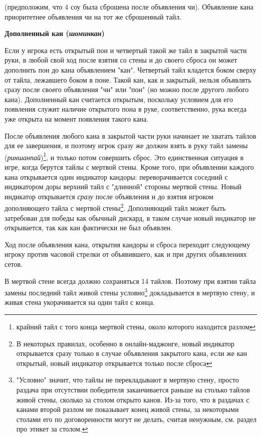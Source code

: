  \hfill {}

(предположим, что 4 соу была сброшена после объявления чи). Объявление кана приоритетнее объявления чи на тот же сброшенный тайл.

\textbf{Дополненный кан (\textit{шоминкан})}

Если у игрока есть открытый пон и четвертый такой же тайл в закрытой части руки, в любой свой ход после взятия со стены и до своего сброса он может дополнить пон до кана объявлением "кан". Четвертый тайл кладется боком сверху от тайла, лежавшего боком в поне. Такой кан, как и закрытый, нельзя объявлять сразу после своего объявления "чи" или "пон" (но можно после другого любого кана). Дополненный кан считается открытым, поскольку условием для его появления служит наличие открытого пона в руке, соответственно, рука всегда уже открыта на момент появления такого кана.


После объявления любого кана в закрытой части руки начинает не хватать тайлов для ее завершения, и поэтому игрок сразу же должен взять в руку тайл замены (\textit{риншанпай})\footnote{крайний тайл с того конца мертвой стены, около которого находится разлом}, и только потом совершить сброс. Это единственная ситуация в игре, когда берутся тайлы с мертвой стены. Кроме того, при объявлении каждого кана открывается один индикатор кандоры: переворачивается соседний с индикатором доры верхний тайл с "длинной" стороны мертвой стены. Новый индикатор открывается \textit{сразу} после объявления и до взятия игроком дополняющего тайла с мертвой стены\footnote{В некоторых правилах, особенно в онлайн-маджонге, новый индикатор открывается сразу только в случае объявления закрытого кана, если же кан открытый, новый индикатор открывается только после сброса}. Дополняющий тайл может быть затребован для победы как обычный дискард, в таком случае новый индикатор не открывается, так как кан фактически не был объявлен.

Ход после объявления кана, открытия кандоры и сброса переходит следующему игроку против часовой стрелки от объявившего, как и при других объявлениях сетов. 

В мертвой стене всегда должно сохраняться 14 тайлов. Поэтому при взятии тайла замены последний тайл живой стены условно\footnote{"Условно" значит, что тайлы не перекладывают в мертвую стену, просто раздача при отсутствии победителя заканчивается раньше на столько тайлов живой стены, сколько за столом открыто канов. Из-за того, что в раздачах с канами второй разлом не показывает конец живой стены, за некоторыми столами его по договоренности могут не делать, считая ненужным, см. раздел про этикет за столом.} докладывается в мертвую стену, и живая стена укорачивается на один тайл с конца.

